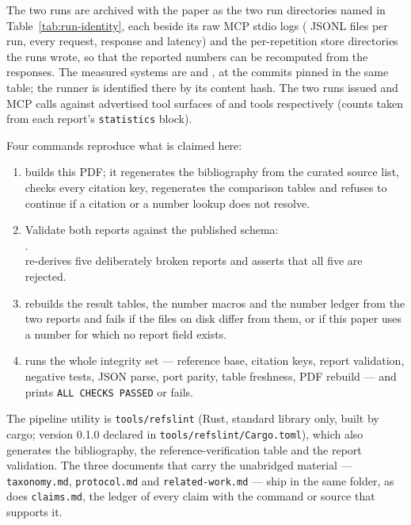 \documentclass[11pt,a4paper]{article}
\begin{document}
The two runs are archived with the paper as the two run directories named in
Table~\ref{tab:run-identity}, each beside its raw MCP stdio logs ( JSONL
files per run, every request, response and latency) and the per-repetition store directories the
runs wrote, so that the reported numbers can be recomputed from the responses. The measured
systems are  and , at the
commits pinned in the same table; the runner is identified there by its content
hash. The two runs issued  and  MCP calls
against advertised tool surfaces of  and
 tools respectively (counts taken from each report's
\texttt{statistics} block).

Four commands reproduce what is claimed here:

\begin{enumerate}[leftmargin=1.4em]
\item {} builds this PDF; it regenerates the bibliography from the curated
source list, checks every citation key, regenerates the comparison tables and refuses to continue
if a citation or a number lookup does not resolve.
\item Validate both reports against the published schema:\\
.\\
 re-derives five deliberately broken reports and asserts that all five
are rejected.
\item {} rebuilds the result tables, the number macros and
the number ledger from the two reports and fails if the files on disk differ from them, or if
this paper uses a number for which no report field exists.
\item {} runs the whole integrity set --- reference base, citation keys,
report validation, negative tests, JSON parse, port parity, table freshness, PDF rebuild --- and
prints \texttt{ALL CHECKS PASSED} or fails.
\end{enumerate}

The pipeline utility is \texttt{tools/refslint} (Rust, standard library only, built by cargo;
version 0.1.0 declared in \texttt{tools/refslint/Cargo.toml}), which also generates the
bibliography, the reference-verification table and the report validation. The three documents
that carry the unabridged material --- \texttt{taxonomy.md}, \texttt{protocol.md} and
\texttt{related-work.md} --- ship in the same folder, as does \texttt{claims.md}, the ledger of
every claim with the command or source that supports it.
\end{document}
